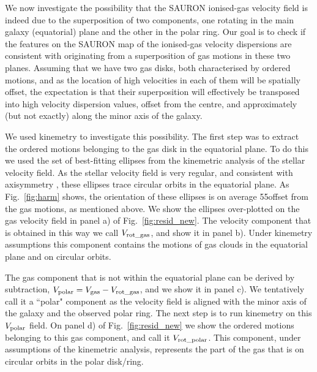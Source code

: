 \documentclass[fleqn,usenatbib]{mnras}
\begin{document}
We now investigate the possibility that the SAURON ionised-gas velocity field is indeed due to the superposition of two components, one rotating in the main galaxy (equatorial) plane and the other in the polar ring. Our goal is to check if the features on the SAURON map of the ionised-gas velocity dispersions are consistent with originating from a superposition of gas motions in these two planes. Assuming that we have two gas disks, both characterised by ordered motions, and as the location of high velocities in each of them will be spatially offset, the expectation is that their superposition will effectively be transposed into high velocity dispersion values, offset from the centre, and approximately (but not exactly) along the minor axis of the galaxy.

We used kinemetry to investigate this possibility. The first step was to extract the ordered motions belonging to the gas disk in the equatorial plane. To do this we used the set of best-fitting ellipses from the kinemetric analysis of the stellar velocity field. As the stellar velocity field is very regular, and consistent with axisymmetry \citep{krajnovic_atlas3d_2011}, these ellipses trace circular orbits in the equatorial plane. As Fig.~\ref{fig:harm} shows, the orientation of these ellipses is on average 55\degr offset from the gas motions, as mentioned above. We show the ellipses over-plotted on the gas velocity field in panel a) of Fig.~\ref{fig:resid_new}. The velocity component that is obtained in this way we call $V_{\rm rot\_gas}$, and show it in panel b). Under kinemetry assumptions this component contains the motions of gas clouds in the equatorial plane and on circular orbits. 

The gas component that is not within the equatorial plane can be derived by subtraction, $V_{\rm polar} = V_{\rm gas} - V_{\rm rot\_gas}$, and we show it in panel c). We tentatively call it a ``polar" component as the velocity field is aligned with the minor axis of the galaxy and the observed polar ring. The next step is to run kinemetry on this $V_{\rm polar}$ field. On panel d) of Fig.~\ref{fig:resid_new} we show the ordered motions belonging to this gas component, and call it $V_{\rm rot\_polar}$. This component, under assumptions of the kinemetric analysis, represents the part of the gas that is on circular orbits in the polar disk/ring. 
\end{document}
